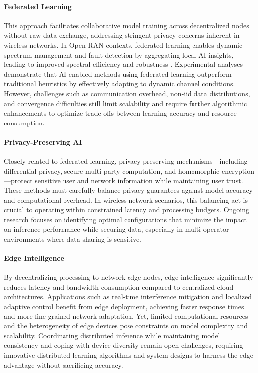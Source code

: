 \documentclass[sigconf]{acmart}
\begin{document}
\paragraph{Federated Learning} This approach facilitates collaborative model training across decentralized nodes without raw data exchange, addressing stringent privacy concerns inherent in wireless networks. In Open RAN contexts, federated learning enables dynamic spectrum management and fault detection by aggregating local AI insights, leading to improved spectral efficiency and robustness \cite{ref49}. Experimental analyses demonstrate that AI-enabled methods using federated learning outperform traditional heuristics by effectively adapting to dynamic channel conditions. However, challenges such as communication overhead, non-iid data distributions, and convergence difficulties still limit scalability and require further algorithmic enhancements to optimize trade-offs between learning accuracy and resource consumption.

\paragraph{Privacy-Preserving AI} Closely related to federated learning, privacy-preserving mechanisms—including differential privacy, secure multi-party computation, and homomorphic encryption—protect sensitive user and network information while maintaining user trust. These methods must carefully balance privacy guarantees against model accuracy and computational overhead. In wireless network scenarios, this balancing act is crucial to operating within constrained latency and processing budgets. Ongoing research focuses on identifying optimal configurations that minimize the impact on inference performance while securing data, especially in multi-operator environments where data sharing is sensitive.

\paragraph{Edge Intelligence} By decentralizing processing to network edge nodes, edge intelligence significantly reduces latency and bandwidth consumption compared to centralized cloud architectures. Applications such as real-time interference mitigation and localized adaptive control benefit from edge deployment, achieving faster response times and more fine-grained network adaptation. Yet, limited computational resources and the heterogeneity of edge devices pose constraints on model complexity and scalability. Coordinating distributed inference while maintaining model consistency and coping with device diversity remain open challenges, requiring innovative distributed learning algorithms and system designs to harness the edge advantage without sacrificing accuracy.
\end{document}
